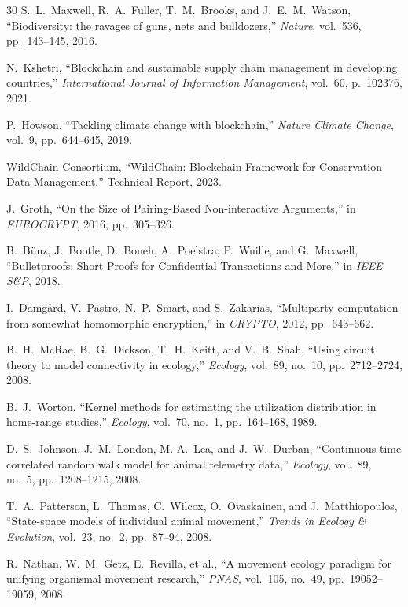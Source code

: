 \begin{thebibliography}{30}
S.~L.~Maxwell, R.~A.~Fuller, T.~M.~Brooks, and J.~E.~M.~Watson, ``Biodiversity: the ravages of guns, nets and bulldozers,'' \emph{Nature}, vol.~536, pp.~143--145, 2016.

N.~Kshetri, ``Blockchain and sustainable supply chain management in developing countries,'' \emph{International Journal of Information Management}, vol.~60, p.~102376, 2021.

P.~Howson, ``Tackling climate change with blockchain,'' \emph{Nature Climate Change}, vol.~9, pp.~644--645, 2019.

WildChain Consortium, ``WildChain: Blockchain Framework for Conservation Data Management,'' Technical Report, 2023.

J.~Groth, ``On the Size of Pairing-Based Non-interactive Arguments,'' in \emph{EUROCRYPT}, 2016, pp.~305--326.

B.~B{\"u}nz, J.~Bootle, D.~Boneh, A.~Poelstra, P.~Wuille, and G.~Maxwell, ``Bulletproofs: Short Proofs for Confidential Transactions and More,'' in \emph{IEEE S\&P}, 2018.

I.~Damg{\aa}rd, V.~Pastro, N.~P.~Smart, and S.~Zakarias, ``Multiparty computation from somewhat homomorphic encryption,'' in \emph{CRYPTO}, 2012, pp.~643--662.

B.~H.~McRae, B.~G.~Dickson, T.~H.~Keitt, and V.~B.~Shah, ``Using circuit theory to model connectivity in ecology,'' \emph{Ecology}, vol.~89, no.~10, pp.~2712--2724, 2008.

B.~J.~Worton, ``Kernel methods for estimating the utilization distribution in home-range studies,'' \emph{Ecology}, vol.~70, no.~1, pp.~164--168, 1989.

D.~S.~Johnson, J.~M.~London, M.-A.~Lea, and J.~W.~Durban, ``Continuous-time correlated random walk model for animal telemetry data,'' \emph{Ecology}, vol.~89, no.~5, pp.~1208--1215, 2008.

T.~A.~Patterson, L.~Thomas, C.~Wilcox, O.~Ovaskainen, and J.~Matthiopoulos, ``State-space models of individual animal movement,'' \emph{Trends in Ecology \& Evolution}, vol.~23, no.~2, pp.~87--94, 2008.

R.~Nathan, W.~M.~Getz, E.~Revilla, et al., ``A movement ecology paradigm for unifying organismal movement research,'' \emph{PNAS}, vol.~105, no.~49, pp.~19052--19059, 2008.


\end{thebibliography}
